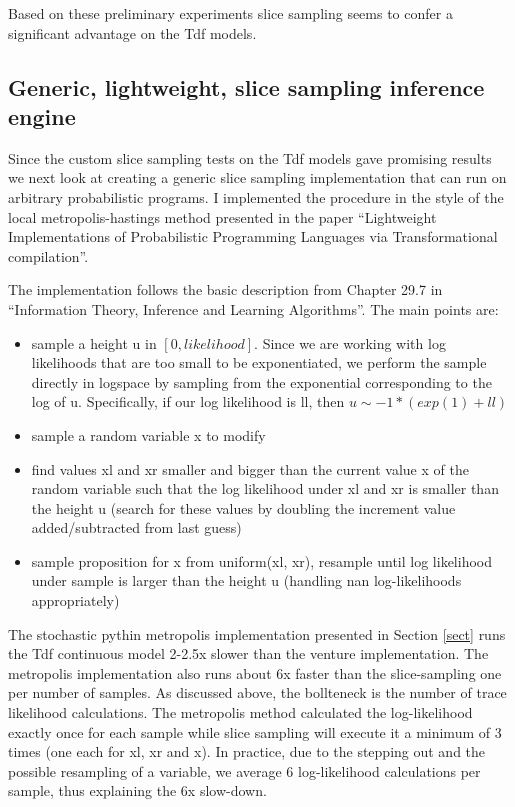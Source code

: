 Based on these preliminary experiments slice sampling seems to confer a significant advantage on the Tdf models.

\subsection{Generic, lightweight, slice sampling inference engine}

Since the custom slice sampling tests on the Tdf models gave promising results we next look at creating a generic slice sampling implementation that can run on arbitrary probabilistic programs. I implemented the procedure in the style of the local metropolis-hastings method presented in the paper “Lightweight Implementations of Probabilistic Programming Languages via Transformational compilation”.

The implementation follows the basic description from Chapter 29.7 in “Information Theory, Inference and Learning Algorithms”. The main points are:
\begin{itemize}

\item
sample a height u in $[0, likelihood]$. Since we are working with log likelihoods that are too small to be exponentiated, we perform the sample directly in logspace by sampling from the exponential corresponding to the log of u. Specifically, if our log likelihood is ll, then $u \sim -1 * (exp(1) + ll)$

\item
sample a random variable x to modify

\item
find values xl and xr smaller and bigger than the current value x of the random variable such that the log likelihood under xl and xr is smaller than the height u (search for these values by doubling the increment value added/subtracted from last guess)

\item
sample proposition for x from uniform(xl, xr), resample until log likelihood under sample is larger than the height u (handling nan log-likelihoods appropriately)

\end{itemize}

The stochastic pythin metropolis implementation presented in Section \ref{sect} runs the Tdf continuous model 2-2.5x slower than the venture implementation. The metropolis implementation also runs about 6x faster than the slice-sampling one per number of samples. As discussed above, the bollteneck is the number of trace likelihood calculations. The metropolis method calculated the log-likelihood exactly once for each sample while slice sampling will execute it a minimum of 3 times (one each for xl, xr and x). In practice, due to the stepping out and the possible resampling of a variable, we average 6 log-likelihood calculations per sample, thus explaining the 6x slow-down.

